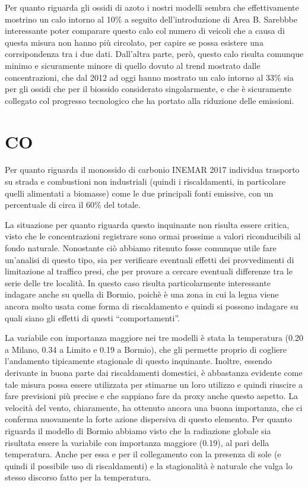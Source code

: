\documentclass[a4paper]{report}
\begin{document}
Per quanto riguarda gli ossidi di azoto i nostri modelli sembra che effettivamente mostrino un calo intorno al 10\% a seguito dell'introduzione di Area B. Sarebbbe interessante poter comparare questo calo col numero di veicoli che a causa di questa misura non hanno più circolato, per capire se possa esistere una corrsipondenza tra i due dati. Dall'altra parte, però, questo calo risulta comunque minimo e sicuramente minore di quello dovuto al trend mostrato dalle concentrazioni, che dal 2012 ad oggi hanno mostrato un calo intorno al 33\% sia per gli ossidi che per il biossido considerato singolarmente, e che è sicuramente collegato col progresso tecnologico che ha portato alla riduzione delle emissioni.

\section{CO}
Per quanto riguarda il monossido di carbonio INEMAR 2017 individua trasporto su strada e combustioni non industriali (quindi i riscaldamenti, in particolare quelli alimentati a biomasse) come le due principali fonti emissive, con un percentuale di circa il 60\% del totale.

La situazione per quanto riguarda questo inquinante non risulta essere critica, visto che le concentrazioni registrare sono ormai prossime a valori riconducibili al fondo naturale. Nonostante ciò abbiamo ritenuto fosse comunque utile fare un'analisi di questo tipo, sia per verificare eventuali effetti dei provvedimenti di limitazione al traffico presi, che per provare a cercare eventuali differenze tra le serie delle tre località. In questo caso risulta particolarmente interessante indagare anche su quella di Bormio, poichè è una zona in cui la legna viene ancora molto usata come forma di riscaldamento e quindi si possono indagare su quali siano gli effetti di questi ``comportamenti''.

La variabile con importanza maggiore nei tre modelli è stata la temperatura (0.20 a Milano, 0.34 a Limito e 0.19 a Bormio), che gli permette proprio di cogliere l'andamento tipicamente stagionale di questo inquinante. Inoltre, essendo derivante in buona parte dai riscaldamenti domestici, è abbastanza evidente come tale misura possa essere utilizzata per stimarne un loro utilizzo e quindi riuscire a fare previsioni più precise e che sappiano fare da proxy anche questo aspetto.
La velocità del vento, chiaramente, ha ottenuto ancora una buona importanza, che ci conferma nuovamente la forte azione dispersiva di questo elemento.
Per quanto riguarda il modello di Bormio abbiamo visto che la radiazione globale sia risultata essere la variabile con importanza maggiore (0.19), al pari della temperatura. Anche per essa e per il collegamento con la presenza di sole (e quindi il possibile uso di riscaldamenti) e la stagionalità è naturale che valga lo stesso discorso fatto per la temperatura.
\end{document}
